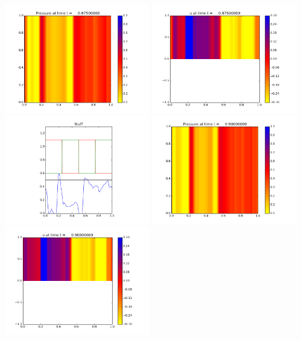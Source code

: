 \documentclass[11pt]{article}
\begin{document}
\vskip 10pt 
\includegraphics[width=0.475\textwidth]{frame0035fig0.png}
\includegraphics[width=0.475\textwidth]{frame0035fig1.png}
\vskip 10pt 
\includegraphics[width=0.475\textwidth]{frame0035fig3.png}
\vskip 10pt 
\includegraphics[width=0.475\textwidth]{frame0036fig0.png}
\includegraphics[width=0.475\textwidth]{frame0036fig1.png}
\end{document}
